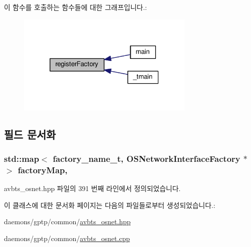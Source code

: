 이 함수를 호출하는 함수들에 대한 그래프입니다.\+:
\nopagebreak
\begin{figure}[H]
\begin{center}
\leavevmode
\includegraphics[width=244pt]{class_o_s_network_interface_factory_a31c35b66fcf0061135c152be8e602acd_icgraph}
\end{center}
\end{figure}




\subsection{필드 문서화}
\subsubsection[{\texorpdfstring{factory\+Map}{factoryMap}}]{\setlength{\rightskip}{0pt plus 5cm}std\+::map$<$ {\bf factory\+\_\+name\+\_\+t}, {\bf O\+S\+Network\+Interface\+Factory} $\ast$ $>$ factory\+Map\hspace{0.3cm}{\ttfamily [static]}, {\ttfamily [private]}}\hypertarget{class_o_s_network_interface_factory_a60237a7c73ac326584618193523c9350}{}\label{class_o_s_network_interface_factory_a60237a7c73ac326584618193523c9350}


avbts\+\_\+osnet.\+hpp 파일의 391 번째 라인에서 정의되었습니다.



이 클래스에 대한 문서화 페이지는 다음의 파일들로부터 생성되었습니다.\+:\begin{DoxyCompactItemize}
\item 
daemons/gptp/common/\hyperlink{avbts__osnet_8hpp}{avbts\+\_\+osnet.\+hpp}\item 
daemons/gptp/common/\hyperlink{avbts__osnet_8cpp}{avbts\+\_\+osnet.\+cpp}\end{DoxyCompactItemize}
